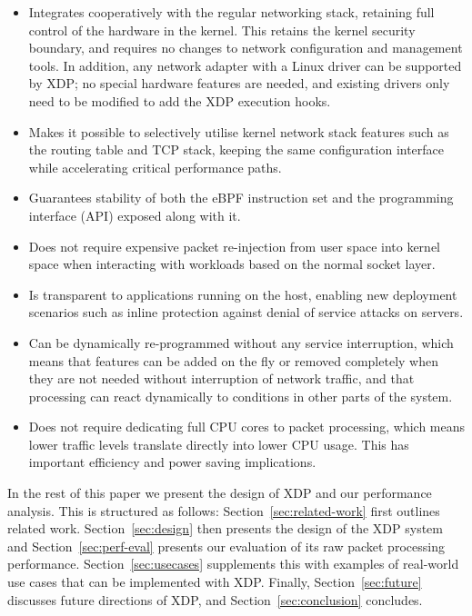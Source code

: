 \documentclass[sigconf]{acmart}
\begin{document}
\begin{itemize}
\item Integrates cooperatively with the regular networking stack, retaining full
  control of the hardware in the kernel. This retains the kernel security
  boundary, and requires no changes to network configuration and management
  tools. In addition, any network adapter with a Linux driver can be supported
  by XDP; no special hardware features are needed, and existing drivers only
  need to be modified to add the XDP execution hooks.

\item Makes it possible to selectively utilise kernel network stack features
  such as the routing table and TCP stack, keeping the same configuration
  interface while accelerating critical performance paths.

\item Guarantees stability of both the eBPF instruction set and the programming
  interface (API) exposed along with it.

\item Does not require expensive packet re-injection from user space into kernel
  space when interacting with workloads based on the normal socket layer.

\item Is transparent to applications running on the host, enabling new
  deployment scenarios such as inline protection against denial of service
  attacks on servers.

\item Can be dynamically re-programmed without any service interruption, which
  means that features can be added on the fly or removed completely when they
  are not needed without interruption of network traffic, and that processing
  can react dynamically to conditions in other parts of the system.

\item Does not require dedicating full CPU cores to packet processing, which
  means lower traffic levels translate directly into lower CPU usage. This has
  important efficiency and power saving implications.
\end{itemize}

In the rest of this paper we present the design of XDP and our performance
analysis. This is structured as follows: Section~\ref{sec:related-work} first
outlines related work. Section~\ref{sec:design} then presents the design of the
XDP system and Section~\ref{sec:perf-eval} presents our evaluation of its raw
packet processing performance. Section~\ref{sec:usecases} supplements this with
examples of real-world use cases that can be implemented with XDP. Finally,
Section~\ref{sec:future} discusses future directions of XDP, and
Section~\ref{sec:conclusion} concludes.
\end{document}
